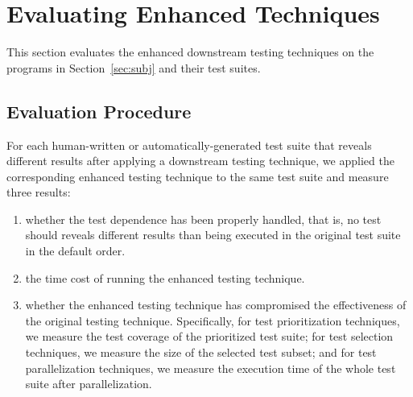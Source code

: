 
\section{Evaluating Enhanced Techniques}
\label{sec:evaluation}

This section evaluates the enhanced downstream
testing techniques on the programs in Section~\ref{sec:subj}
and their test suites.



\subsection{Evaluation Procedure}

For each human-written or automatically-generated
test suite that reveals different results after
applying a downstream testing technique, we applied
the corresponding enhanced testing technique to the
same test suite and measure three results:

\begin{enumerate}
\item whether the test dependence
has been properly handled, that is, no test should
reveals different results than being executed in the original
test suite in the default order.

\item the time cost of running the enhanced
testing technique.

\item whether the enhanced testing technique has compromised
the effectiveness of the original testing technique.
Specifically, for test prioritization techniques, we measure
the test coverage of the prioritized test suite; for test
selection techniques, we measure the size of the selected
test subset; and for test parallelization techniques, we measure
the execution time of the whole test suite after parallelization.


\end{enumerate}


